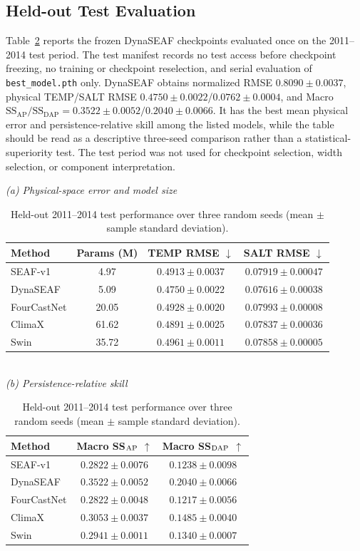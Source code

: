 \documentclass[conference]{IEEEtran}
\begin{document}
\subsection{Held-out Test Evaluation}
Table~\ref{tab:test_main} reports the frozen DynaSEAF checkpoints evaluated once on the 2011--2014 test period. The test manifest records no test access before checkpoint freezing, no training or checkpoint reselection, and serial evaluation of \texttt{best\_model.pth} only. DynaSEAF obtains normalized RMSE $0.8090\pm0.0037$, physical TEMP/SALT RMSE $0.4750\pm0.0022$/$0.0762\pm0.0004$, and Macro $\mathrm{SS}_{\mathrm{AP}}/\mathrm{SS}_{\mathrm{DAP}}=0.3522\pm0.0052/0.2040\pm0.0066$. It has the best mean physical error and persistence-relative skill among the listed models, while the table should be read as a descriptive three-seed comparison rather than a statistical-superiority test. The test period was not used for checkpoint selection, width selection, or component interpretation.

\begin{table}[!t]
\centering
\caption{Held-out 2011--2014 test performance over three random seeds (mean $\pm$ sample standard deviation).}
\label{tab:test_main}
\scriptsize
\setlength{\tabcolsep}{3.0pt}
\renewcommand{\arraystretch}{1.05}
\textit{(a) Physical-space error and model size}\\[2pt]
\begin{tabular}{lccc}
\toprule
Method & Params (M) & TEMP RMSE $\downarrow$ & SALT RMSE $\downarrow$\\
\midrule
\rowcolor{seafblue} SEAF-v1 & 4.97 & $0.4913\!\pm\!0.0037$ & $0.07919\!\pm\!0.00047$\\
DynaSEAF & 5.09 & $\mathbf{0.4750\!\pm\!0.0022}$ & $\mathbf{0.07616\!\pm\!0.00038}$\\
FourCastNet & 20.05 & $0.4928\!\pm\!0.0020$ & $0.07993\!\pm\!0.00008$\\
ClimaX & 61.62 & $\mathbf{0.4891\!\pm\!0.0025}$ & $\mathbf{0.07837\!\pm\!0.00036}$\\
Swin & 35.72 & $0.4961\!\pm\!0.0011$ & $0.07858\!\pm\!0.00005$\\
\bottomrule
\end{tabular}\\[4pt]
\textit{(b) Persistence-relative skill}\\[2pt]
\begin{tabular}{lcc}
\toprule
Method & Macro SS$_{\rm AP}$ $\uparrow$ & Macro SS$_{\rm DAP}$ $\uparrow$\\
\midrule
\rowcolor{seafblue} SEAF-v1 & $0.2822\!\pm\!0.0076$ & $0.1238\!\pm\!0.0098$\\
DynaSEAF & $\mathbf{0.3522\!\pm\!0.0052}$ & $\mathbf{0.2040\!\pm\!0.0066}$\\
FourCastNet & $0.2822\!\pm\!0.0048$ & $0.1217\!\pm\!0.0056$\\
ClimaX & $\mathbf{0.3053\!\pm\!0.0037}$ & $\mathbf{0.1485\!\pm\!0.0040}$\\
Swin & $0.2941\!\pm\!0.0011$ & $0.1340\!\pm\!0.0007$\\
\bottomrule
\end{tabular}
\end{table}
\end{document}
